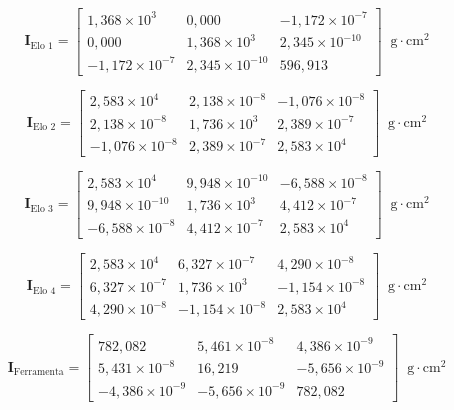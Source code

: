 \begin{equation}
\mathbf{I}_{\text{Elo 1}} =
\begin{bmatrix}
1,368\times 10^{3} & 0,000 & -1,172\times 10^{-7} \\
0,000 & 1,368\times 10^{3} & 2,345\times 10^{-10} \\
-1,172\times 10^{-7} & 2,345\times 10^{-10} & 596,913
\end{bmatrix} \;\; \text{g$\cdot$cm$^{2}$}
\end{equation}

\begin{equation}
\mathbf{I}_{\text{Elo 2}} =
\begin{bmatrix}
2,583\times 10^{4} & 2,138\times 10^{-8} & -1,076\times 10^{-8} \\
2,138\times 10^{-8} & 1,736\times 10^{3} & 2,389\times 10^{-7} \\
-1,076\times 10^{-8} & 2,389\times 10^{-7} & 2,583\times 10^{4}
\end{bmatrix} \;\; \text{g$\cdot$cm$^{2}$}
\end{equation}

\begin{equation}
\mathbf{I}_{\text{Elo 3}} =
\begin{bmatrix}
2,583\times 10^{4} & 9,948\times 10^{-10} & -6,588\times 10^{-8} \\
9,948\times 10^{-10} & 1,736\times 10^{3} & 4,412\times 10^{-7} \\
-6,588\times 10^{-8} & 4,412\times 10^{-7} & 2,583\times 10^{4}
\end{bmatrix} \;\; \text{g$\cdot$cm$^{2}$}
\end{equation}

\begin{equation}
\mathbf{I}_{\text{Elo 4}} =
\begin{bmatrix}
2,583\times 10^{4} & 6,327\times 10^{-7} & 4,290\times 10^{-8} \\
6,327\times 10^{-7} & 1,736\times 10^{3} & -1,154\times 10^{-8} \\
4,290\times 10^{-8} & -1,154\times 10^{-8} & 2,583\times 10^{4}
\end{bmatrix} \;\; \text{g$\cdot$cm$^{2}$}
\end{equation}

\begin{equation}
\mathbf{I}_{\text{Ferramenta}} =
\begin{bmatrix}
782,082 & 5,461\times 10^{-8} & 4,386\times 10^{-9} \\
5,431\times 10^{-8} & 16,219 & -5,656\times 10^{-9} \\
-4,386\times 10^{-9} & -5,656\times 10^{-9} & 782,082
\end{bmatrix} \;\; \text{g$\cdot$cm$^{2}$}
\end{equation}

